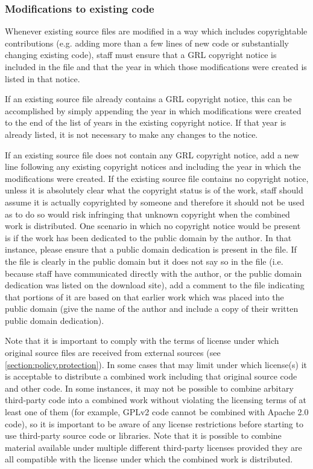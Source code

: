 \documentclass[10pt,a4paper]{article}
\begin{document}
\subsubsection{Modifications to existing code}
\par Whenever existing source files are modified in a way which includes copyrightable 
contributions (e.g. adding more than a few lines of new code or substantially changing 
existing code), staff must ensure that a GRL copyright notice is included in the file 
and that the year in which those modifications were created is listed in that notice. 

\par If an existing source file already contains a GRL copyright notice, this can be 
accomplished by simply appending the year in which modifications were created 
to the end of the list of years in the existing copyright notice. If that year is already 
listed, it is not necessary to make any changes to the notice. 

\par If an existing source file does not contain any GRL copyright notice, add a 
new line following any existing copyright notices and including the year in which 
the modifications were created. If the existing source file contains no copyright 
notice, unless it is absolutely clear what the copyright status is of the work, staff 
should assume it is actually copyrighted by someone and therefore it should not 
be used as to do so would risk infringing that unknown copyright when the 
combined work is distributed. One scenario in which no copyright notice would be 
present is if the work has been dedicated to the public domain by the author. In 
that instance, please ensure that a public domain dedication is present in the file. 
If the file is clearly in the public domain but it does not say so in the file (i.e. because 
staff have communicated directly with the author, or the public domain dedication was 
listed on the download site), add a comment to the file indicating that portions of it 
are based on that earlier work which was placed into the public domain (give the 
name of the author and include a copy of their written public domain dedication). 

\par Note that it is important to comply with the terms of license under 
which original source files are received from external sources (see 
\ref{section:policy.protection}). In some cases that may limit 
under which license(s) it is acceptable to distribute a combined work  
including that original source code and other code. In some instances, it may not  
be possible to combine arbitary third-party code into a combined work without 
violating the licensing terms of at least one of them (for example, GPLv2 code 
cannot be combined with Apache 2.0 code), so it is important to be aware 
of any license restrictions before starting to use third-party source code or libraries. 
Note that it is possible to combine material available under multiple different 
third-party licenses provided they are all compatible with the license under which 
the combined work is distributed.
\end{document}
